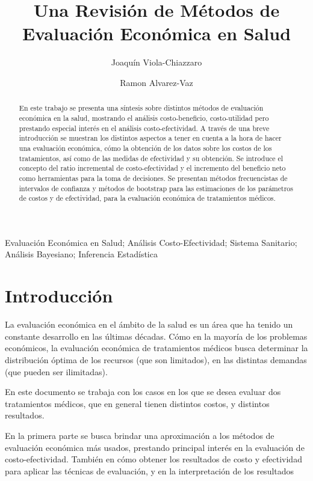 \documentclass{siep}
\title[Una Revisi\'on de M\'etodos de Evaluaci\'on Econ\'omica en Saluds]{Una Revisi\'on de M\'etodos de Evaluaci\'on Econ\'omica en Salud}
\author[ad1][]{Joaqu\'in Viola-Chiazzaro}
\author[ad2][]{Ramon Alvarez-Vaz}
\begin{document}
\begin{abstract}
En este trabajo se presenta una s\'intesis sobre distintos métodos de evaluación económica en la salud, mostrando el análisis costo-beneficio, costo-utilidad pero prestando especial interés en el análisis costo-efectividad.
A trav\'es de una breve introducción se muestran los distintos aspectos a tener en cuenta a la hora de hacer una evaluación económica, cómo la obtención de los datos sobre los costos de los tratamientos, así como de las medidas de efectividad y su obtención.
Se introduce el concepto del ratio incremental de costo-efectividad y el incremento del beneficio neto como herramientas para la toma de decisiones.
Se presentan métodos frecuencistas de intervalos de confianza y métodos de bootstrap para las estimaciones de los parámetros de costos y de efectividad, para la evaluación económica de tratamientos médicos.

\end{abstract}

\begin{keywords}
Evaluación Económica en Salud; Análisis Costo-Efectividad; Sistema Sanitario; Análisis Bayesiano; Inferencia Estadística
\end{keywords}
\maketitle

\section{Introducci\'on}
\label{sec:Intro}
La evaluación económica en el ámbito de la salud es un área que ha tenido un constante desarrollo en las últimas décadas. Cómo en la mayoría de los problemas económicos, la evaluación económica de tratamientos médicos busca determinar la distribución óptima de los recursos (que son limitados), en las distintas demandas (que pueden ser ilimitadas).

En este documento se trabaja con los casos en los que se desea evaluar dos tratamientos médicos, que en general tienen distintos costos, y distintos resultados.

En la primera parte se busca brindar una aproximación a los métodos de evaluación económica más usados, prestando principal interés en la evaluación de costo-efectividad. También en cómo obtener los resultados de costo y efectividad para aplicar las técnicas de evaluación, y en la interpretación de los resultados
\end{document}

